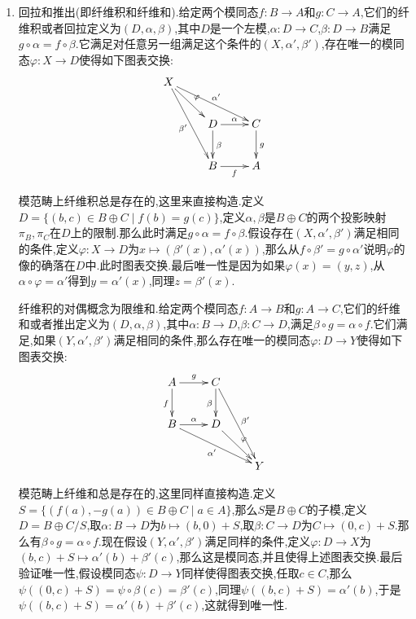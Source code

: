 \begin{enumerate}
\begin{proof}
		构造二重$k$线性映射$\varphi^*:A\times B\to X$为$(a,b)\mapsto f(a)g(b)$.于是存在唯一的$k$模同态$\varphi:A\otimes_kB\to X$提升了$\varphi^*$,即$\varphi(a\otimes b)=f(a)g(b)$.还需要说明$\varphi$是代数同态,为此只需验证$\varphi((a\otimes b)(a'\otimes b'))=\varphi(a\otimes b)\varphi(a'\otimes b')$,这从交换性直接得出.于是我们找到了$k$代数同态$\varphi$满足上述交换图.最后还需要验证唯一性.设$\psi$是同样满足交换图的$k$代数同态,那么从$a\otimes b=(a\otimes1)(1\otimes b)=\alpha(a)\beta(b)$得到$\psi(a\otimes b)=\psi(\alpha(a)\beta(b))=f(a)g(b)=\varphi(a\otimes b)$,而$\{a\otimes b\mid a\in A,b\in B\}$生成了整个张量积,这就得到唯一性.
	\end{proof}
    \item 回拉和推出(即纤维积和纤维和).给定两个模同态$f:B\to A$和$g:C\to A$,它们的纤维积或者回拉定义为$(D,\alpha,\beta)$,其中$D$是一个左模,$\alpha:D\to C$,$\beta:D\to B$满足$g\circ\alpha=f\circ\beta$.它满足对任意另一组满足这个条件的$(X,\alpha',\beta')$,存在唯一的模同态$\varphi:X\to D$使得如下图表交换:
    $$\xymatrix{X\ar[drr]^{\alpha'}\ar[dr]^{\varphi}\ar[ddr]_{\beta'}&&\\&D\ar[r]^{\alpha}\ar[d]^{\beta}&C\ar[d]^g\\&B\ar[r]_f&A}$$
    
    模范畴上纤维积总是存在的,这里来直接构造.定义$D=\{(b,c)\in B\oplus C\mid f(b)=g(c)\}$,定义$\alpha,\beta$是$B\oplus C$的两个投影映射$\pi_B,\pi_C$在$D$上的限制.那么此时满足$g\circ\alpha=f\circ\beta$.假设存在$(X,\alpha',\beta')$满足相同的条件,定义$\varphi:X\to D$为$x\mapsto(\beta'(x),\alpha'(x))$,那么从$f\circ\beta'=g\circ\alpha'$说明$\varphi$的像的确落在$D$中.此时图表交换.最后唯一性是因为如果$\varphi(x)=(y,z)$,从$\alpha\circ\varphi=\alpha'$得到$y=\alpha'(x)$,同理$z=\beta'(x)$.
    
    纤维积的对偶概念为限维和.给定两个模同态$f:A\to B$和$g:A\to C$,它们的纤维和或者推出定义为$(D,\alpha,\beta)$,其中$\alpha:B\to D$,$\beta:C\to D$,满足$\beta\circ g=\alpha\circ f$.它们满足,如果$(Y,\alpha',\beta')$满足相同的条件,那么存在唯一的模同态$\varphi:D\to Y$使得如下图表交换:
    $$\xymatrix{A\ar[r]^g\ar[d]_f&C\ar[d]_{\beta}\ar[ddr]^{\beta'}&\\B\ar[r]^{\alpha}\ar[drr]_{\alpha'}&D\ar[dr]^{\varphi}&\\&&Y}$$
    
    模范畴上纤维和总是存在的,这里同样直接构造.定义$S=\{(f(a),-g(a))\in B\oplus C\mid a\in A\}$,那么$S$是$B\oplus C$的子模,定义$D=B\oplus C/S$,取$\alpha:B\to D$为$b\mapsto (b,0)+S$,取$\beta:C\to D$为$C\mapsto(0,c)+S$.那么有$\beta\circ g=\alpha\circ f$.现在假设$(Y,\alpha',\beta')$满足同样的条件,定义$\varphi:D\to X$为$(b,c)+S\mapsto\alpha'(b)+\beta'(c)$,那么这是模同态,并且使得上述图表交换.最后验证唯一性,假设模同态$\psi:D\to Y$同样使得图表交换,任取$c\in C$,那么$\psi((0,c)+S)=\psi\circ\beta(c)=\beta'(c)$,同理$\psi((b,c)+S)=\alpha'(b)$,于是$\psi((b,c)+S)=\alpha'(b)+\beta'(c)$,这就得到唯一性.
    

\end{enumerate}
